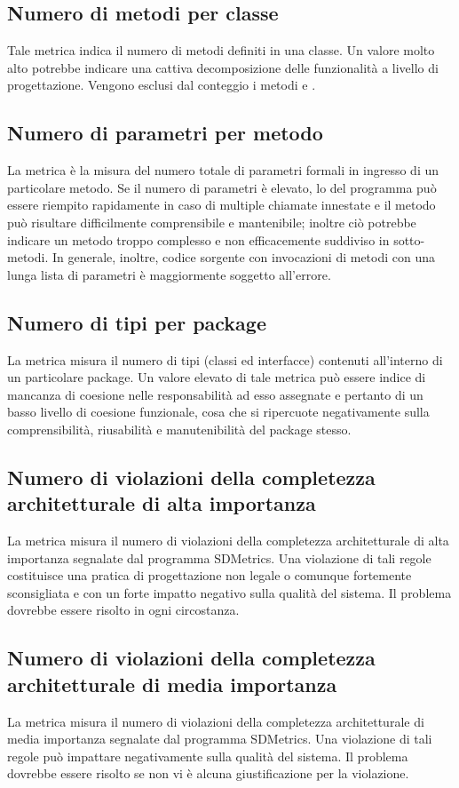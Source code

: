 \subsection{Numero di metodi per classe}
Tale metrica indica il numero di metodi definiti in una classe. Un valore molto alto potrebbe indicare una cattiva decomposizione delle funzionalità a livello di progettazione. Vengono esclusi dal conteggio i metodi \emph{} e \emph{}.

\subsection{Numero di parametri per metodo}
La metrica è la misura del numero totale di parametri formali in ingresso di un particolare metodo. Se il numero di parametri è elevato, lo  del programma può essere riempito rapidamente in caso di multiple chiamate innestate e il metodo può risultare difficilmente comprensibile e mantenibile; inoltre ciò potrebbe indicare un metodo troppo complesso e non efficacemente suddiviso in sotto-metodi. In generale, inoltre, codice sorgente con invocazioni di metodi con una lunga lista di parametri è maggiormente soggetto all'errore.

\subsection{Numero di tipi per package}
La metrica misura il numero di tipi (classi ed interfacce) contenuti all'interno di un particolare package. Un valore elevato di tale metrica può essere indice di mancanza di coesione nelle responsabilità ad esso assegnate e pertanto di un basso livello di coesione funzionale, cosa che si ripercuote negativamente sulla comprensibilità, riusabilità e manutenibilità del package stesso. 

\subsection{Numero di violazioni della completezza architetturale di alta importanza}
La metrica misura il numero di violazioni della completezza architetturale di alta importanza segnalate dal programma SDMetrics. Una violazione di tali regole costituisce una pratica di progettazione non legale o comunque fortemente sconsigliata e con un forte impatto negativo sulla qualità del sistema. Il problema dovrebbe essere risolto in ogni circostanza.

\subsection{Numero di violazioni della completezza architetturale di media importanza}
La metrica misura il numero di violazioni della completezza architetturale di media importanza segnalate dal programma SDMetrics. Una violazione di tali regole può impattare negativamente sulla qualità del sistema. Il problema dovrebbe essere risolto se non vi è alcuna giustificazione per la violazione.

